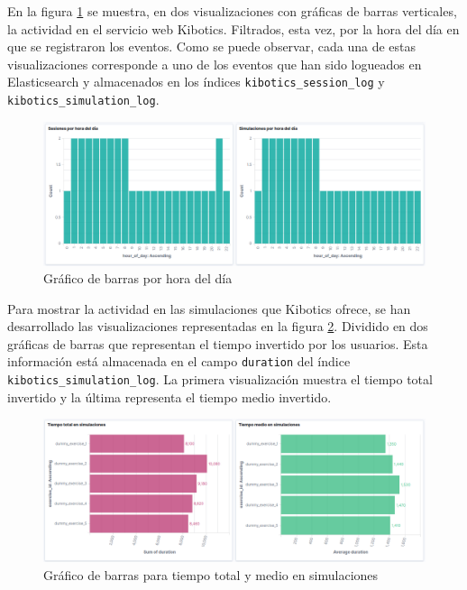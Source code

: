 \documentclass[11pt,a4paper]{book}
\begin{document}
				En la figura \ref{fig:kibana_hourofday} se muestra, en dos visualizaciones con gráficas de barras verticales, la actividad en el servicio web Kibotics. Filtrados, esta vez, por la hora del día en que se registraron los eventos. Como se puede observar, cada una de estas visualizaciones corresponde a uno de los eventos que han sido logueados en Elasticsearch y almacenados en los índices \texttt{kibotics\_session\_log} y \texttt{kibotics\_simulation\_log}.\\
				
				\begin{figure}[H]
					\centering
					\includegraphics[width=14cm, keepaspectratio]{img/kibana_04_hour_of_day}
					\caption{Gráfico de barras por hora del día}
					\label{fig:kibana_hourofday}
				\end{figure}
\newpage		
				
				Para mostrar la actividad en las simulaciones que Kibotics ofrece, se han desarrollado las visualizaciones representadas en la figura \ref{fig:kibana_simulations}. Dividido en dos gráficas de barras que representan el tiempo invertido por los usuarios. Esta información está almacenada en el campo \texttt{duration} del índice \texttt{kibotics\_simulation\_log}. La primera visualización muestra el tiempo total invertido y la última representa el tiempo medio invertido.
				\begin{figure}[H]
					\centering
					\includegraphics[width=13cm, keepaspectratio]{img/kibana_05_simulations}
					\caption{Gráfico de barras para tiempo total y medio en simulaciones}
					\label{fig:kibana_simulations}
				\end{figure}
\end{document}
